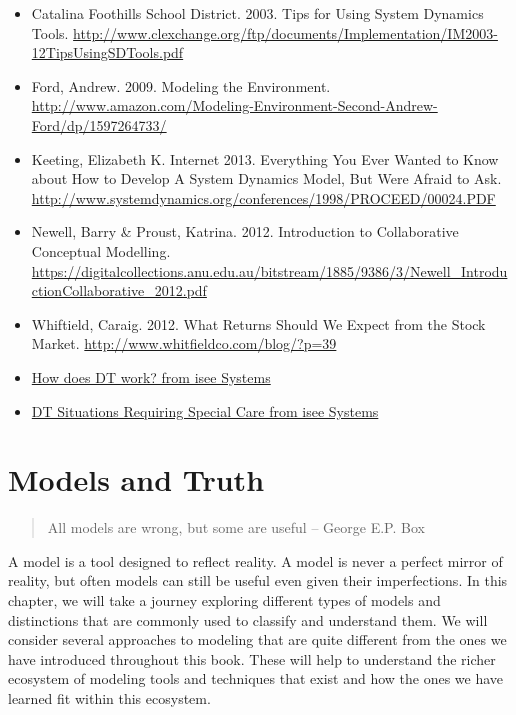 \documentclass[]{memoir}
\begin{document}
\begin{itemize}
\itemsep1pt\parskip0pt
\item
  Catalina Foothills School District. 2003. Tips for Using System
  Dynamics Tools.
  \url{http://www.clexchange.org/ftp/documents/Implementation/IM2003-12TipsUsingSDTools.pdf}
\item
  Ford, Andrew. 2009. Modeling the Environment.
  \url{http://www.amazon.com/Modeling-Environment-Second-Andrew-Ford/dp/1597264733/}
\item
  Keeting, Elizabeth K. Internet 2013. Everything You Ever Wanted to
  Know about How to Develop A System Dynamics Model, But Were Afraid to
  Ask.
  \url{http://www.systemdynamics.org/conferences/1998/PROCEED/00024.PDF}
\item
  Newell, Barry \& Proust, Katrina. 2012. Introduction to Collaborative
  Conceptual Modelling.
  \url{https://digitalcollections.anu.edu.au/bitstream/1885/9386/3/Newell_IntroductionCollaborative_2012.pdf}
\item
  Whiftield, Caraig. 2012. What Returns Should We Expect from the Stock
  Market. \url{http://www.whitfieldco.com/blog/?p=39}
\item
  \href{http://www.iseesystems.com/Helpv9/Content/DT/How_does_DT_work_.htm}{How
  does DT work? from isee Systems}
\item
  \href{http://www.iseesystems.com/Helpv9/Content/DT/DT_Special_Care.htm}{DT
  Situations Requiring Special Care from isee Systems}
\end{itemize}

\chapter{Models and Truth}

\begin{quote}
All models are wrong, but some are useful -- George E.P. Box
\end{quote}

A model is a tool designed to reflect reality. A model is never a
perfect mirror of reality, but often models can still be useful even
given their imperfections. In this chapter, we will take a journey
exploring different types of models and distinctions that are commonly
used to classify and understand them. We will consider several
approaches to modeling that are quite different from the ones we have
introduced throughout this book. These will help to understand the
richer ecosystem of modeling tools and techniques that exist and how the
ones we have learned fit within this ecosystem.
\end{document}

